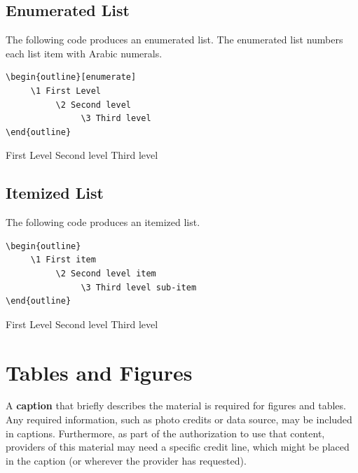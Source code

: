  \subsection{Enumerated List}
 The following code produces an enumerated list.  The enumerated list numbers each list item with Arabic numerals.
 
\begin{verbatim}
\begin{outline}[enumerate]
     \1 First Level
          \2 Second level
               \3 Third level
\end{outline}
 \end{verbatim}
 
 \begin{outline}[enumerate]
 	\1 First Level
		\2 Second level
			\3 Third level
\end{outline}
 

 \subsection{Itemized List}
 The following code produces an itemized list.
 
\begin{verbatim}
\begin{outline}
     \1 First item
          \2 Second level item
               \3 Third level sub-item
\end{outline}
 \end{verbatim}
 
 \begin{outline}
 	\1 First Level
		\2 Second level
			\3 Third level
\end{outline}



\section{Tables and Figures}

A \textbf{caption} that briefly describes the material is required for figures and tables.  Any required information, such as photo credits or data source, may be included in captions. Furthermore, as part of the authorization to use that content, providers of this material may need a specific credit line, which might be placed in the caption (or wherever the provider has requested).  


